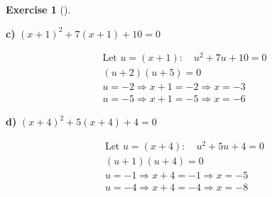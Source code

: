 \documentclass[
  letterpaper,
  DIV=11,
  numbers=noendperiod]{scrreprt}
\theoremstyle{definition}
\newtheorem{exercise}{Exercise}[chapter]
\theoremstyle{remark}
\begin{document}
\begin{exercise}[]
\begin{tcolorbox}
\textbf{c)} \(\displaystyle (x + 1)^2 + 7(x + 1) + 10 = 0\)

\begin{align*}
\text{Let } u = (x + 1): \quad u^2 + 7u + 10 = 0 \\ (u + 2)(u + 5) = 0 \\ u = -2 \Rightarrow x + 1 = -2 \Rightarrow x = -3 \\ u = -5 \Rightarrow x + 1 = -5 \Rightarrow x = -6
\end{align*}

\textbf{d)} \(\displaystyle (x + 4)^2 + 5(x + 4) + 4 = 0\)

\begin{align*}
\text{Let } u = (x + 4): \quad u^2 + 5u + 4 = 0 \\ (u + 1)(u + 4) = 0 \\ u = -1 \Rightarrow x + 4 = -1 \Rightarrow x = -5 \\ u = -4 \Rightarrow x + 4 = -4 \Rightarrow x = -8
\end{align*}

\end{tcolorbox}

\end{exercise}
\end{document}
